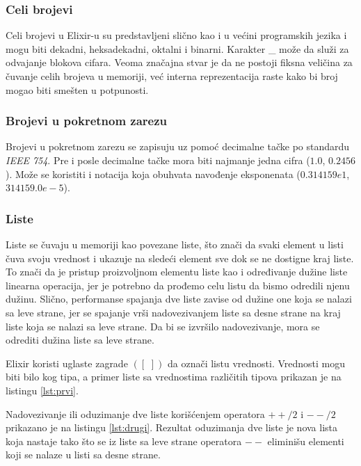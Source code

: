 \documentclass[12pt,oneside]{memoir}
\begin{document}
\subsubsection{Celi brojevi}
Celi brojevi u Elixir-u su predstavljeni slično kao i u većini programskih jezika i mogu biti dekadni, heksadekadni, oktalni i binarni. Karakter \_ može da služi za odvajanje blokova cifara. Veoma značajna stvar je da ne postoji fiksna veličina za čuvanje celih brojeva u memoriji, već interna reprezentacija raste kako bi broj mogao biti smešten u potpunosti.

\subsubsection{Brojevi u pokretnom zarezu}
Brojevi u pokretnom zarezu se zapisuju uz pomoć decimalne tačke po standardu \textit{IEEE 754}. Pre i posle decimalne tačke mora biti najmanje jedna cifra ($1.0$, $0.2456$). Može se koristiti i notacija koja obuhvata navođenje eksponenata ($0.314159e1$, $314159.0e-5$). 

\subsubsection{Liste}
Liste se čuvaju u memoriji kao povezane liste, što znači da svaki element u listi čuva svoju vrednost i ukazuje na sledeći element sve dok se ne dostigne kraj liste. To znači da je pristup proizvoljnom elementu liste kao i određivanje dužine liste linearna operacija, jer je potrebno da prođemo celu listu da bismo odredili njenu dužinu. Slično, performanse spajanja dve liste zavise od dužine one koja se nalazi sa leve strane, jer se spajanje vrši nadovezivanjem liste sa desne strane na kraj liste koja se nalazi sa leve strane. Da bi se izvršilo nadovezivanje, mora se odrediti dužina liste sa leve strane.

Elixir koristi uglaste zagrade $([\,\,])$ da označi listu vrednosti. Vrednosti mogu biti bilo kog tipa, a primer liste sa vrednostima različitih tipova prikazan je na listingu \ref{lst:prvi}.



Nadovezivanje ili oduzimanje dve liste korišćenjem operatora $++/2$ i $--/2$ prikazano je na listingu \ref{lst:drugi}. Rezultat oduzimanja dve liste je nova lista koja nastaje tako što se iz liste sa leve strane operatora $--$ eliminišu elementi koji se nalaze u listi sa desne strane.
\end{document}
